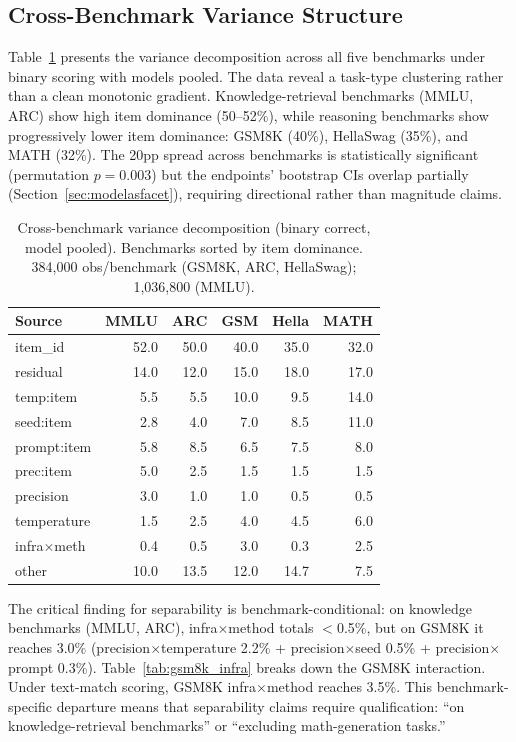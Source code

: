\documentclass[11pt,twocolumn]{article}
\begin{document}
\subsection{Cross-Benchmark Variance Structure}
\label{sec:crossbenchmark}

Table~\ref{tab:crossbench} presents the variance decomposition across all five benchmarks under binary scoring with models pooled. The data reveal a task-type clustering rather than a clean monotonic gradient. Knowledge-retrieval benchmarks (MMLU, ARC) show high item dominance (50--52\%), while reasoning benchmarks show progressively lower item dominance: GSM8K (40\%), HellaSwag (35\%), and MATH (32\%). The 20pp spread across benchmarks is statistically significant (permutation $p=0.003$) but the endpoints' bootstrap CIs overlap partially (Section~\ref{sec:modelasfacet}), requiring directional rather than magnitude claims.

\begin{table}[t]
\centering
\caption{Cross-benchmark variance decomposition (binary correct, model pooled). Benchmarks sorted by item dominance. 384,000 obs/benchmark (GSM8K, ARC, HellaSwag); 1,036,800 (MMLU).}
\label{tab:crossbench}
\small
\begin{tabular}{@{}lrrrrr@{}}
\toprule
Source & MMLU & ARC & GSM & Hella & MATH \\
\midrule
item\_id & 52.0 & 50.0 & 40.0 & 35.0 & 32.0 \\
residual & 14.0 & 12.0 & 15.0 & 18.0 & 17.0 \\
temp:item & 5.5 & 5.5 & 10.0 & 9.5 & 14.0 \\
seed:item & 2.8 & 4.0 & 7.0 & 8.5 & 11.0 \\
prompt:item & 5.8 & 8.5 & 6.5 & 7.5 & 8.0 \\
prec:item & 5.0 & 2.5 & 1.5 & 1.5 & 1.5 \\
precision & 3.0 & 1.0 & 1.0 & 0.5 & 0.5 \\
temperature & 1.5 & 2.5 & 4.0 & 4.5 & 6.0 \\
infra$\times$meth & 0.4 & 0.5 & 3.0 & 0.3 & 2.5 \\
other & 10.0 & 13.5 & 12.0 & 14.7 & 7.5 \\
\bottomrule
\end{tabular}
\end{table}

The critical finding for separability is benchmark-conditional: on knowledge benchmarks (MMLU, ARC), infra$\times$method totals $<$0.5\%, but on GSM8K it reaches 3.0\% (precision$\times$temperature 2.2\% + precision$\times$seed 0.5\% + precision$\times$prompt 0.3\%). Table~\ref{tab:gsm8k_infra} breaks down the GSM8K interaction. Under text-match scoring, GSM8K infra$\times$method reaches 3.5\%. This benchmark-specific departure means that separability claims require qualification: ``on knowledge-retrieval benchmarks'' or ``excluding math-generation tasks.''
\end{document}
